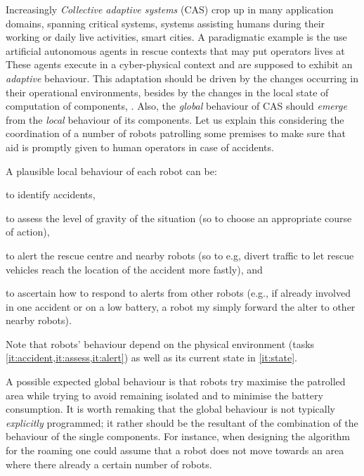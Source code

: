Increasingly \emph{Collective adaptive systems} (CAS) crop up in many
application domains, spanning critical systems, systems assisting
humans during their working or daily live activities, smart cities.
%
A paradigmatic example is the use artificial autonomous agents in
rescue contexts that may put operators lives at 
%
These agents execute in a cyber-physical context and are supposed to
exhibit an \emph{adaptive} behaviour.
%
This adaptation should be driven by the changes occurring in their
operational environments, besides by the changes in the local state of
computation of components, .
%
Also, the \emph{global} behaviour of CAS should \emph{emerge} from the
\emph{local} behaviour of its components.
%
Let us explain this considering the coordination of a number of robots
patrolling some premises to make sure that aid is promptly given to
human operators in case of accidents.

A plausible local behaviour of each robot can be:
\begin{enumerate*}[label=(\arabic*)]
\item\label{it:accident} to identify accidents,
\item\label{it:assess} to assess the level of gravity of the situation
  (so to choose an appropriate course of action),
\item\label{it:alert} to alert the rescue centre and nearby robots (so
  to e.g, divert traffic to let rescue vehicles reach the location of
  the accident more fastly), and
\item\label{it:state} to ascertain how to respond to alerts from other
  robots (e.g., if already involved in one accident or on a low
  battery, a robot my simply forward the alter to other nearby
  robots).
\end{enumerate*}
%
Note that robots' behaviour depend on the physical environment (tasks
\cref{it:accident,it:assess,it:alert}) as well as its current state in
\cref{it:state}.

A possible expected global behaviour is that robots try maximise the
patrolled area while trying to avoid remaining isolated and to minimise
the battery consumption.
%
It is worth remaking that the global behaviour is not typically
\emph{explicitly} programmed; it rather should be the resultant
of the combination of the behaviour of the single components.
%
For instance, when designing the algorithm for the roaming one
could assume that a robot does not move towards an area where
there already a certain number of robots.


